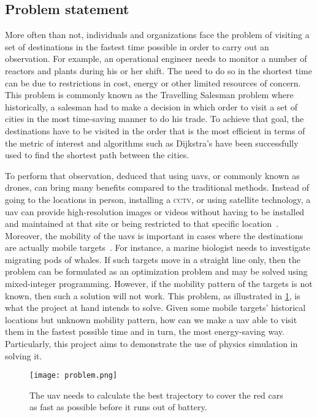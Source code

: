 \documentclass[../main.tex]{subfiles}
\begin{document}
\subsection{Problem statement}

More often than not, individuals and organizations face the problem
of visiting a set of destinations in the fastest time possible
in order to carry out an observation.
For example, an operational engineer needs to monitor
a number of reactors and plants during his or her shift.
The need to do so in the shortest time can be due to restrictions in
cost, energy or other limited resources of concern.
This problem is commonly known as the Travelling Salesman problem
where historically, a salesman had to make a decision in which order
to visit a set of cities in the most time-saving manner to do his trade.
To achieve that goal, the destinations have to be visited in the order
that is the most efficient in terms of the metric of interest
and algorithms such as Dijkstra's have been successfully used 
to find the shortest path between the cities.

To perform that observation, \textcite{Sha19}
deduced that using \glspl{uav}, or commonly known as drones,
can bring many benefits 
compared to the traditional methods.
Instead of going to the locations in person, installing a \textsc{cctv},
or using satellite technology, a \gls{uav} can provide
high-resolution images or videos without 
having to be installed and maintained at that site
or being restricted to that specific location~\cite{Sha19}.
Moreover, the mobility of the \glspl{uav} is important
in cases where the destinations are actually mobile targets~\cite{Sha19}.
For instance, a marine biologist needs to investigate 
migrating pods of whales.
If such targets move in a straight line only,
then the problem can be formulated as an optimization problem
and may be solved using mixed-integer programming.
However, if the mobility pattern of the targets is not known,
then such a solution will not work.
This problem, as illustrated in \cref{fig:problem}, 
is what the project at hand intends to solve.
Given some mobile targets' historical locations 
but unknown mobility pattern,
how can we make a \gls{uav} able to visit them
in the fastest possible time and in turn, the most energy-saving way. 
Particularly, this project aims to demonstrate the 
use of physics simulation in solving it. 

\begin{figure}[htb] 
    \centering
    \texttt{[image: problem.png]} 
    \caption{The \gls{uav} needs to calculate 
    the best trajectory to cover the red cars
    as fast as possible before it runs out of battery.} 
    \label{fig:problem} 
\end{figure}
\end{document}
